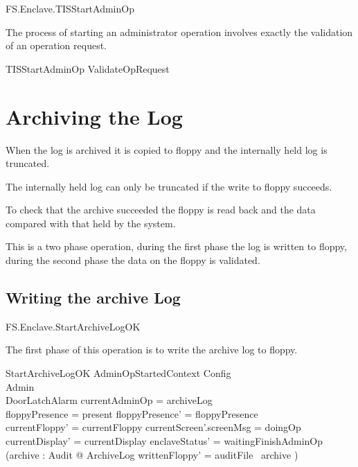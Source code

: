 \begin{traceunit}{FS.Enclave.TISStartAdminOp}
\end{traceunit}

The process of starting an administrator operation involves exactly the validation of an
operation request.

\begin{zed}
        TISStartAdminOp  ValidateOpRequest
\end{zed}


\section{Archiving the Log}


When the log is archived it is copied to floppy and the internally
held log is truncated.

The internally held log can only be truncated if the write to floppy
succeeds.  

To check that the archive succeeded the floppy is read back and the
data compared with that held by the system.

This is a two phase operation, during the first phase the log is
written to floppy, during the second phase the data on the floppy is
validated. 


\subsection{Writing the archive Log}

\begin{traceunit}{FS.Enclave.StartArchiveLogOK}
\end{traceunit}


The first phase of this operation is to write the archive log to
floppy.

\begin{schema}{StartArchiveLogOK}
        AdminOpStartedContext
\also   
        \Xi Config
\\      \Xi Admin 
\\      \Xi DoorLatchAlarm    
\where
        \The currentAdminOp = archiveLog
\\      floppyPresence = present
\also
        floppyPresence' = floppyPresence
\\      currentFloppy' = currentFloppy
\also
        currentScreen'.screenMsg = doingOp
\\      currentDisplay' = currentDisplay
\also
        enclaveStatus' = waitingFinishAdminOp
\\      (\exists archive : \finset Audit @ ArchiveLog \land
writtenFloppy' = auditFile~ archive )
\end{schema}

